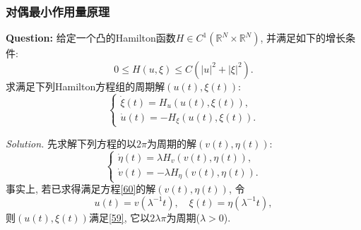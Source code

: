 \documentclass[12pt,a4paper]{article}
\begin{document}
\subsubsection{对偶最小作用量原理}

\textbf{Question:} 给定一个凸的Hamilton函数$H \in C^1(\mathbb{R}^N \times \mathbb{R}^N)$, 并满足如下的增长条件:
\begin{equation*}
    0 \leq H(u, \xi) \leq C(|u|^2 + |\xi|^2).
\end{equation*}
求满足下列Hamilton方程组的周期解$(u(t), \xi(t))$:
\begin{equation}\label{59}
    \begin{cases}
        \dot \xi(t) = H_u(u(t), \xi(t)), \\ 
        \dot u(t) = -H_{\xi}(u(t), \xi(t)).
    \end{cases}
\end{equation}

\emph{Solution.} 先求解下列方程的以$2\pi$为周期的解$(v(t), \eta(t))$:
\begin{equation}\label{60}
    \begin{cases}
        \dot \eta(t) = \lambda H_v(v(t), \eta(t)), \\ 
        \dot v(t) = -\lambda H_{\eta}(v(t), \eta(t)).
    \end{cases}
\end{equation}
事实上, 若已求得满足方程\eqref{60}的解$(v(t), \eta(t))$, 令 
\begin{equation*}
    u(t) = v(\lambda^{-1}t), \quad \xi(t) = \eta(\lambda^{-1}t),
\end{equation*}
则$(u(t), \xi(t))$满足\eqref{59}, 它以$2\lambda\pi$为周期($\lambda > 0$).
\end{document}
